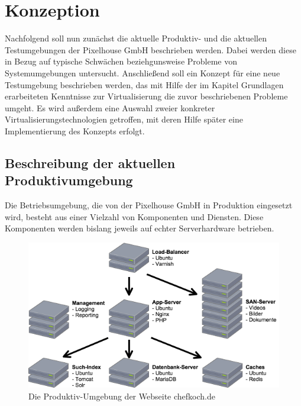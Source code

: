 \section{Konzeption}

Nachfolgend soll nun zunächst die aktuelle Produktiv- und die aktuellen Testumgebungen der Pixelhouse GmbH beschrieben werden. Dabei werden diese in Bezug auf typische Schwächen beziehgunsweise Probleme von Systemumgebungen untersucht. Anschließend soll ein Konzept für eine neue Testumgebung beschrieben werden, das mit Hilfe der im Kapitel Grundlagen erarbeiteten Kenntnisse zur Virtualisierung die zuvor beschriebenen Probleme umgeht. Es wird außerdem eine Auswahl zweier konkreter Virtualisierungstechnologien getroffen, mit deren Hilfe später eine Implementierung des Konzepts erfolgt.

\subsection{Beschreibung der aktuellen Produktivumgebung}

Die Betriebsumgebung, die von der Pixelhouse GmbH in Produktion eingesetzt wird, besteht aus einer Vielzahl von Komponenten und Diensten. Diese Komponenten werden bislang jeweils auf echter Serverhardware betrieben.

\begin{figure}[!ht]
  \begin{center}
    \includegraphics[width=14cm]{bilder/Produktiv-Umgebung.png}
    \caption{Die Produktiv-Umgebung der Webseite chefkoch.de}
    \label{produktion}
  \end{center}
\end{figure}

